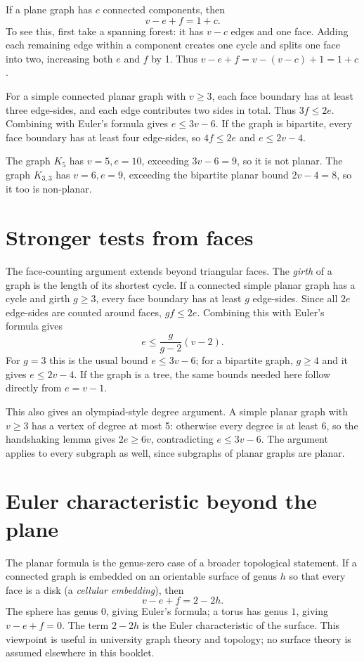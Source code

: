 \Challenge{} If a plane graph has $c$ connected components, then
\[
v-e+f=1+c.
\]
To see this, first take a spanning forest: it has $v-c$ edges and one face. Adding each remaining edge within a component creates one cycle and splits one face into two, increasing both $e$ and $f$ by 1. Thus $v-e+f=v-(v-c)+1=1+c$.

For a simple connected planar graph with $v\geq 3$, each face boundary has at least three edge-sides, and each edge contributes two sides in total. Thus $3f\leq 2e$. Combining with Euler's formula gives $e\leq 3v-6$. If the graph is bipartite, every face boundary has at least four edge-sides, so $4f\leq 2e$ and $e\leq 2v-4$.

\Challenge{} The graph $K_5$ has $v=5,e=10$, exceeding $3v-6=9$, so it is not planar. The graph $K_{3,3}$ has $v=6,e=9$, exceeding the bipartite planar bound $2v-4=8$, so it too is non-planar.

\section*{\Challenge{} Stronger tests from faces}
The face-counting argument extends beyond triangular faces. The \emph{girth} of a graph is the length of its shortest cycle. If a connected simple planar graph has a cycle and girth $g\geq 3$, every face boundary has at least $g$ edge-sides. Since all $2e$ edge-sides are counted around faces, $gf\leq 2e$. Combining this with Euler's formula gives
\[
e\leq \frac{g}{g-2}(v-2).
\]
For $g=3$ this is the usual bound $e\leq 3v-6$; for a bipartite graph, $g\geq 4$ and it gives $e\leq 2v-4$. If the graph is a tree, the same bounds needed here follow directly from $e=v-1$.

This also gives an olympiad-style degree argument. A simple planar graph with $v\geq 3$ has a vertex of degree at most 5: otherwise every degree is at least 6, so the handshaking lemma gives $2e\geq 6v$, contradicting $e\leq 3v-6$. The argument applies to every subgraph as well, since subgraphs of planar graphs are planar.

\section*{\Uni{} Euler characteristic beyond the plane}
The planar formula is the genus-zero case of a broader topological statement. If a connected graph is embedded on an orientable surface of genus $h$ so that every face is a disk (a \emph{cellular embedding}), then
\[
v-e+f=2-2h.
\]
The sphere has genus $0$, giving Euler's formula; a torus has genus $1$, giving $v-e+f=0$. The term $2-2h$ is the Euler characteristic of the surface. This viewpoint is useful in university graph theory and topology; no surface theory is assumed elsewhere in this booklet.

